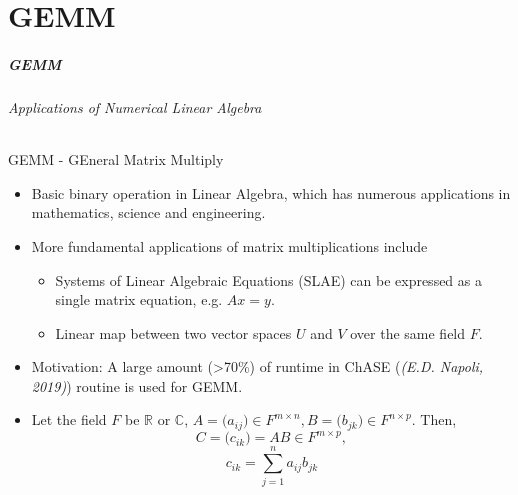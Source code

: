 \part{GEMM}
\makepart

\begin{frame}
\frametitle{GEMM}
\framesubtitle{Applications of Numerical Linear Algebra}
GEMM - GEneral Matrix Multiply
\begin{itemize}
 \item Basic binary operation in Linear Algebra, which has numerous applications in mathematics, science and engineering.
 \item More fundamental applications of matrix multiplications include
  \begin{itemize}
   \item Systems of Linear Algebraic Equations (SLAE) can be expressed as a single matrix equation, e.g. \(Ax = y\). 
   \item Linear map between two vector spaces \(U\) and \(V\) over the same field \(F\).
  \end{itemize}
 \item Motivation: A large amount (>70\%) of runtime in ChASE (\emph{(E.D. Napoli, 2019)}) routine is used for GEMM.
 \item Let the field \(F\) be \(\mathbb{R}\) or \(\mathbb{C}\), \(A =\big( a_{ij} \big) \in F^{m \times n}, B =\big( b_{jk} \big) \in F^{n \times p}\). Then,
 \begin{equation}
  C=\big( c_{ik} \big)=AB \in F^{m \times p},
 \end{equation}
 \begin{equation}
  c_{ik} = \sum_{j=1}^n{a_{ij}b_{jk}}
 \end{equation}
\end{itemize}
\end{frame}


